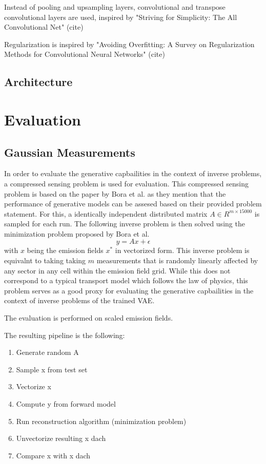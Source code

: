Instead of pooling and upsampling layers, convolutional and transpose convolutional layers are used, inspired by "Striving for Simplicity: The All Convolutional Net" (cite)

Regularization is inspired by "Avoiding Overfitting: A Survey on Regularization Methods for Convolutional Neural Networks" (cite)

\subsection{Architecture}

\section{Evaluation}

\subsection{Gaussian Measurements}
In order to evaluate the generative capbailities in the context of inverse problems, a compressed sensing problem is used for evaluation.
This compressed sensing problem is based on the paper by Bora et al. as they mention that the performance of generative models can be assesed based on their provided problem statement.
For this, a identically independent distributed matrix $A \in R^{m \times 15000}$ is sampled for each run.
The following inverse problem is then solved using the minimization problem proposed by Bora et al.
\begin{equation}
    y = A x + \epsilon
\end{equation}
with $x$ being the emission fields $x^*$ in vectorized form.
This inverse problem is equivalnt to taking taking $m$ measurements that is randomly linearly affected by any sector in any cell within the emission field grid.
While this does not correspond to a typical transport model which follows the law of physics, this problem serves as a good proxy for evaluating the generative capbailities in the context of inverse problems of the trained VAE. 

The evaluation is performed on scaled emission fields.

The resulting pipeline is the following:
\begin{enumerate}
    \item Generate random A
    \item Sample x from test set
    \item Vectorize x
    \item Compute y from forward model
    \item Run reconstruction algorithm (minimization problem)
    \item Unvectorize resulting x dach
    \item Compare x with x dach
\end{enumerate}

